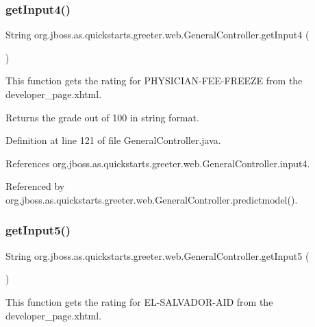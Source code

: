\subsubsection{\texorpdfstring{get\+Input4()}{getInput4()}}
{\footnotesize\ttfamily String org.\+jboss.\+as.\+quickstarts.\+greeter.\+web.\+General\+Controller.\+get\+Input4 (\begin{DoxyParamCaption}{ }\end{DoxyParamCaption})}



This function gets the rating for P\+H\+Y\+S\+I\+C\+I\+A\+N-\/\+F\+E\+E-\/\+F\+R\+E\+E\+ZE from the developer\+\_\+page.\+xhtml. 

\begin{DoxyReturn}{Returns}
the grade out of 100 in string format. 
\end{DoxyReturn}


Definition at line 121 of file General\+Controller.\+java.



References org.\+jboss.\+as.\+quickstarts.\+greeter.\+web.\+General\+Controller.\+input4.



Referenced by org.\+jboss.\+as.\+quickstarts.\+greeter.\+web.\+General\+Controller.\+predictmodel().

\mbox{\label{classorg_1_1jboss_1_1as_1_1quickstarts_1_1greeter_1_1web_1_1_general_controller_a82ecfd53f0265fb359d46a544966242e}} 
\subsubsection{\texorpdfstring{get\+Input5()}{getInput5()}}
{\footnotesize\ttfamily String org.\+jboss.\+as.\+quickstarts.\+greeter.\+web.\+General\+Controller.\+get\+Input5 (\begin{DoxyParamCaption}{ }\end{DoxyParamCaption})}



This function gets the rating for E\+L-\/\+S\+A\+L\+V\+A\+D\+O\+R-\/\+A\+ID from the developer\+\_\+page.\+xhtml. 


